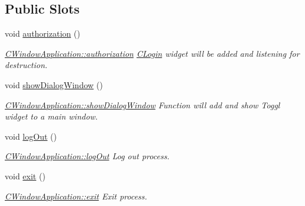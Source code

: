 \subsection*{Public Slots}
\begin{DoxyCompactItemize}
\item 
\mbox{\label{classCWindowApplication_a67ef45f45ee188fad8747beb819ff922}} 
void \hyperlink{classCWindowApplication_a67ef45f45ee188fad8747beb819ff922}{authorization} ()
\begin{DoxyCompactList}\small\item\em \hyperlink{classCWindowApplication_a67ef45f45ee188fad8747beb819ff922}{C\+Window\+Application\+::authorization} \hyperlink{classCLogin}{C\+Login} widget will be added and listening for destruction. \end{DoxyCompactList}\item 
\mbox{\label{classCWindowApplication_a7d18c08e4d018f798fb26114894bf679}} 
void \hyperlink{classCWindowApplication_a7d18c08e4d018f798fb26114894bf679}{show\+Dialog\+Window} ()
\begin{DoxyCompactList}\small\item\em \hyperlink{classCWindowApplication_a7d18c08e4d018f798fb26114894bf679}{C\+Window\+Application\+::show\+Dialog\+Window} Function will add and show Toggl widget to a main window. \end{DoxyCompactList}\item 
\mbox{\label{classCWindowApplication_a83df0063be9e8ec016de341f239b08d6}} 
void \hyperlink{classCWindowApplication_a83df0063be9e8ec016de341f239b08d6}{log\+Out} ()
\begin{DoxyCompactList}\small\item\em \hyperlink{classCWindowApplication_a83df0063be9e8ec016de341f239b08d6}{C\+Window\+Application\+::log\+Out} Log out process. \end{DoxyCompactList}\item 
\mbox{\label{classCWindowApplication_a98b0442fdf1041b6ec50857e79e3fa40}} 
void \hyperlink{classCWindowApplication_a98b0442fdf1041b6ec50857e79e3fa40}{exit} ()
\begin{DoxyCompactList}\small\item\em \hyperlink{classCWindowApplication_a98b0442fdf1041b6ec50857e79e3fa40}{C\+Window\+Application\+::exit} Exit process. \end{DoxyCompactList}\item 

\end{DoxyCompactItemize}
